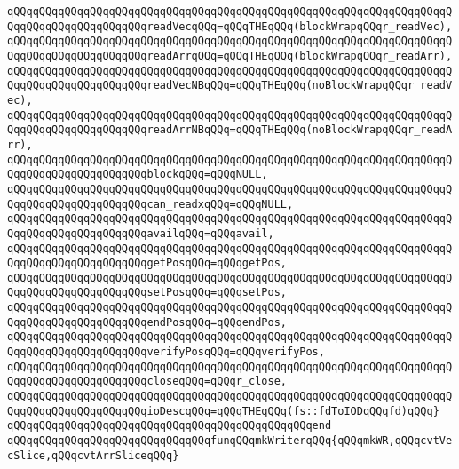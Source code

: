 \verb|qQQqqQQqqQQqqQQqqQQqqQQqqQQqqQQqqQQqqQQqqQQqqQQqqQQqqQQqqQQqqQQqqQQqqQQqqQQqqQQqqQQqqQQqqQQqreadVecqQQq=qQQqTHEqQQq(blockWrapqQQqr_readVec),|\newline
\verb|qQQqqQQqqQQqqQQqqQQqqQQqqQQqqQQqqQQqqQQqqQQqqQQqqQQqqQQqqQQqqQQqqQQqqQQqqQQqqQQqqQQqqQQqqQQqreadArrqQQq=qQQqTHEqQQq(blockWrapqQQqr_readArr),|\newline
\verb|qQQqqQQqqQQqqQQqqQQqqQQqqQQqqQQqqQQqqQQqqQQqqQQqqQQqqQQqqQQqqQQqqQQqqQQqqQQqqQQqqQQqqQQqqQQqreadVecNBqQQq=qQQqTHEqQQq(noBlockWrapqQQqr_readVec),|\newline
\verb|qQQqqQQqqQQqqQQqqQQqqQQqqQQqqQQqqQQqqQQqqQQqqQQqqQQqqQQqqQQqqQQqqQQqqQQqqQQqqQQqqQQqqQQqqQQqreadArrNBqQQq=qQQqTHEqQQq(noBlockWrapqQQqr_readArr),|\newline
\verb|qQQqqQQqqQQqqQQqqQQqqQQqqQQqqQQqqQQqqQQqqQQqqQQqqQQqqQQqqQQqqQQqqQQqqQQqqQQqqQQqqQQqqQQqqQQqblockqQQq=qQQqNULL,|\newline
\verb|qQQqqQQqqQQqqQQqqQQqqQQqqQQqqQQqqQQqqQQqqQQqqQQqqQQqqQQqqQQqqQQqqQQqqQQqqQQqqQQqqQQqqQQqqQQqcan_readxqQQq=qQQqNULL,|\newline
\verb|qQQqqQQqqQQqqQQqqQQqqQQqqQQqqQQqqQQqqQQqqQQqqQQqqQQqqQQqqQQqqQQqqQQqqQQqqQQqqQQqqQQqqQQqqQQqavailqQQq=qQQqavail,|\newline
\verb|qQQqqQQqqQQqqQQqqQQqqQQqqQQqqQQqqQQqqQQqqQQqqQQqqQQqqQQqqQQqqQQqqQQqqQQqqQQqqQQqqQQqqQQqqQQqgetPosqQQq=qQQqgetPos,|\newline
\verb|qQQqqQQqqQQqqQQqqQQqqQQqqQQqqQQqqQQqqQQqqQQqqQQqqQQqqQQqqQQqqQQqqQQqqQQqqQQqqQQqqQQqqQQqqQQqsetPosqQQq=qQQqsetPos,|\newline
\verb|qQQqqQQqqQQqqQQqqQQqqQQqqQQqqQQqqQQqqQQqqQQqqQQqqQQqqQQqqQQqqQQqqQQqqQQqqQQqqQQqqQQqqQQqqQQqendPosqQQq=qQQqendPos,|\newline
\verb|qQQqqQQqqQQqqQQqqQQqqQQqqQQqqQQqqQQqqQQqqQQqqQQqqQQqqQQqqQQqqQQqqQQqqQQqqQQqqQQqqQQqqQQqqQQqverifyPosqQQq=qQQqverifyPos,|\newline
\verb|qQQqqQQqqQQqqQQqqQQqqQQqqQQqqQQqqQQqqQQqqQQqqQQqqQQqqQQqqQQqqQQqqQQqqQQqqQQqqQQqqQQqqQQqqQQqcloseqQQq=qQQqr_close,|\newline
\verb|qQQqqQQqqQQqqQQqqQQqqQQqqQQqqQQqqQQqqQQqqQQqqQQqqQQqqQQqqQQqqQQqqQQqqQQqqQQqqQQqqQQqqQQqqQQqioDescqQQq=qQQqTHEqQQq(fs::fdToIODqQQqfd)qQQq}|\newline
\verb|qQQqqQQqqQQqqQQqqQQqqQQqqQQqqQQqqQQqqQQqqQQqqQQqend|\newline
\newline
\verb|qQQqqQQqqQQqqQQqqQQqqQQqqQQqqQQqfunqQQqmkWriterqQQq{qQQqmkWR,qQQqcvtVecSlice,qQQqcvtArrSliceqQQq}|\newline
